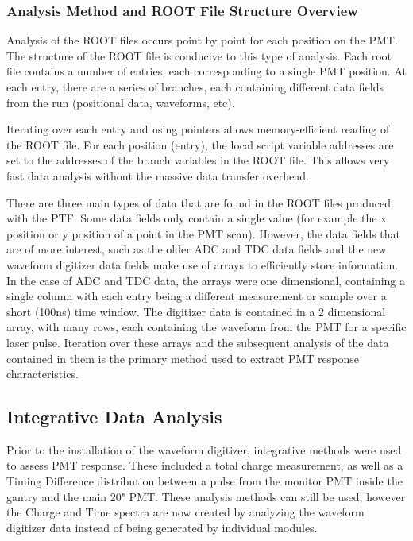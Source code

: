 \documentclass[twoside,letterpaper]{refart}
\begin{document}
\subsubsection{Analysis Method and ROOT File Structure Overview}

Analysis of the ROOT files occurs point by point for each position on the PMT.  The structure of the ROOT file is conducive to this type of analysis.  Each root file contains a number of entries, each corresponding to a single PMT position.  At each entry, there are a series of branches, each containing different data fields from the run (positional data, waveforms, etc).

Iterating over each entry and using pointers allows memory-efficient reading of the ROOT file.  For each position (entry), the local script variable addresses are set to the addresses of the branch variables in the ROOT file. This allows very fast data analysis without the massive data transfer overhead.  

There are three main types of data that are found in the ROOT files produced with the PTF. Some data fields only contain a single value (for example the x position or y position of a point in the PMT scan).  However, the data fields that are of more interest, such as the older ADC and TDC data fields and the new waveform digitizer data fields make use of arrays to efficiently store information.  In the case of ADC and TDC data, the arrays were one dimensional, containing a single column with each entry being a different measurement or sample over a short (100ns) time window.  The digitizer data is contained in a 2 dimensional array, with many rows, each containing the waveform from the PMT for a specific laser pulse.  Iteration over these arrays and the subsequent analysis of the data contained in them is the primary method used to extract PMT response characteristics.

\subsection{Integrative Data Analysis}

Prior to the installation of the waveform digitizer, integrative methods were used to assess PMT response.  These included a total charge measurement, as well as a Timing Difference distribution between a pulse from the monitor PMT inside the gantry and the main 20" PMT. These analysis methods can still be used, however the Charge and Time spectra are now created by analyzing the waveform digitizer data instead of being generated by individual modules. 
\end{document}
